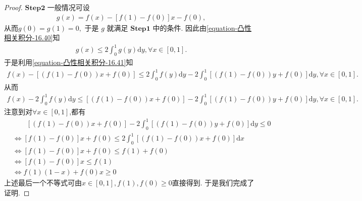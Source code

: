 \documentclass[../../main.tex]{subfiles}%
\begin{document}
\begin{proof}
$\mathbf{Step}\mathbf{2}$ 一般情况可设
\begin{align*}
g\left( x \right) =f\left( x \right) -\left[ f\left( 1 \right) -f\left( 0 \right) \right] x-f\left( 0 \right) ,
\end{align*}
从而$g(0)=g(1)=0,$
于是 $g$ 就满足 $\mathbf{Step}\mathbf{1}$ 中的条件. 因此由\eqref{equation-凸性相关积分-16.40}知
\begin{align}\label{equation-凸性相关积分-16.41}
g\left( x \right) \leqslant 2\int_0^1{g\left( y \right) \mathrm{d}y,}\forall x\in [0,1].
\end{align}
于是利用\eqref{equation-凸性相关积分-16.41}知
\begin{align*}
f\left( x \right) -\left[ \left( f\left( 1 \right) -f\left( 0 \right) \right) x+f\left( 0 \right) \right] \leqslant 2\int_0^1{f\left( y \right) \mathrm{d}y}-2\int_0^1{\left[ \left( f\left( 1 \right) -f\left( 0 \right) \right) y+f\left( 0 \right) \right] \mathrm{d}y},\forall x\in [0,1].
\end{align*}
从而
\begin{align*}
f\left( x \right) -2\int_0^1{f\left( y \right) \mathrm{d}y}\leqslant \left[ \left( f\left( 1 \right) -f\left( 0 \right) \right) x+f\left( 0 \right) \right] -2\int_0^1{\left[ \left( f\left( 1 \right) -f\left( 0 \right) \right) y+f\left( 0 \right) \right] \mathrm{d}y},\forall x\in [0,1].
\end{align*}
注意到对$\forall x\in [0,1]$,都有
\begin{align*}
&\quad \quad \left[ \left( f\left( 1 \right) -f\left( 0 \right) \right) x+f\left( 0 \right) \right] -2\int_0^1{\left[ \left( f\left( 1 \right) -f\left( 0 \right) \right) y+f\left( 0 \right) \right] \mathrm{d}y}\leqslant 0
\\
&\Leftrightarrow \left[ f\left( 1 \right) -f\left( 0 \right) \right] x+f\left( 0 \right) \leqslant 2\int_0^1{\left[ \left( f\left( 1 \right) -f\left( 0 \right) \right) x+f\left( 0 \right) \right] \mathrm{d}x}
\\
&\Leftrightarrow \left[ f\left( 1 \right) -f\left( 0 \right) \right] x+f\left( 0 \right) \leqslant f\left( 1 \right) +f\left( 0 \right) 
\\
&\Leftrightarrow \left[ f\left( 1 \right) -f\left( 0 \right) \right] x\leqslant f\left( 1 \right) 
\\
&\Leftrightarrow f\left( 1 \right) \left( 1-x \right) +f\left( 0 \right) x\geqslant 0
\end{align*}
上述最后一个不等式可由$x\in[0,1],f(1),f(0)\geqslant  0$直接得到.
于是我们完成了证明. 
\end{proof}
\end{document}
